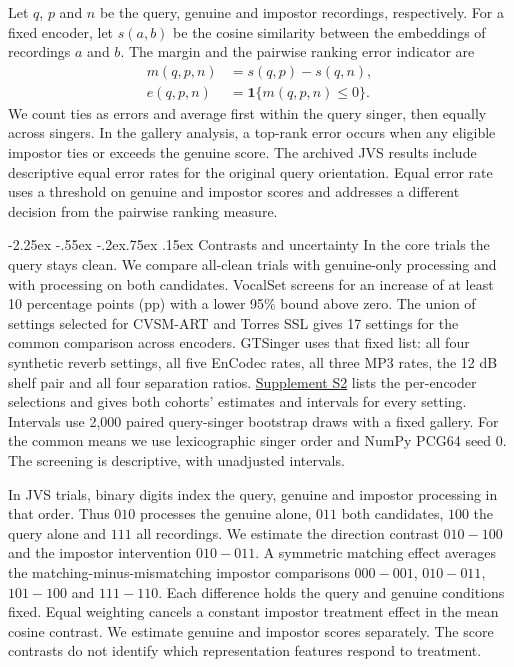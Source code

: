 \documentclass[10pt,a4paper]{article}
\makeatletter
\renewcommand\subsection{\@startsection{subsection}{2}{\z@}%
  {-2.25ex \@plus -.55ex \@minus -.2ex}{.75ex \@plus .15ex}%
  {\normalfont\normalsize\sffamily\bfseries}}
\newcommand{\evidencebase}{https://github.com/hawkeye007-dev/singer-or-studio/blob/2ea186d03cb15b8dee027aee72ddae81a2c91856}
\newcommand{\evidencelink}[2]{\href{\evidencebase/#1}{#2}}
\makeatother
\begin{document}
Let $q$, $p$ and $n$ be the query, genuine and impostor recordings, respectively. For a fixed encoder, let $s(a,b)$ be the cosine similarity between the embeddings of recordings $a$ and $b$. The margin and the pairwise ranking error indicator are
\begin{equation}
 \begin{aligned}
 m(q,p,n)&=s(q,p)-s(q,n),\\
 e(q,p,n)&=\mathbf{1}\{m(q,p,n)\leq 0\}.
 \end{aligned}
 \label{eq:margin}
\end{equation}
We count ties as errors and average first within the query singer, then equally across singers. In the gallery analysis, a top-rank error occurs when any eligible impostor ties or exceeds the genuine score. The archived JVS results include descriptive equal error rates for the original query orientation. Equal error rate uses a threshold on genuine and impostor scores and addresses a different decision from the pairwise ranking measure.

\subsection{Contrasts and uncertainty}
In the core trials the query stays clean. We compare all-clean trials with genuine-only processing and with processing on both candidates. VocalSet screens for an increase of at least 10 percentage points (pp) with a lower 95\% bound above zero. The union of settings selected for CVSM-ART and Torres SSL gives 17 settings for the common comparison across encoders. GTSinger uses that fixed list: all four synthetic reverb settings, all five EnCodec rates, all three MP3 rates, the 12 dB shelf pair and all four separation ratios. \evidencelink{evidence/supplement.md\#s2-core-benchmark-condition-tables}{Supplement S2} lists the per-encoder selections and gives both cohorts' estimates and intervals for every setting. Intervals use 2,000 paired query-singer bootstrap draws with a fixed gallery. For the common means we use lexicographic singer order and NumPy PCG64 seed 0. The screening is descriptive, with unadjusted intervals.

In JVS trials, binary digits index the query, genuine and impostor processing in that order. Thus $010$ processes the genuine alone, $011$ both candidates, $100$ the query alone and $111$ all recordings. We estimate the direction contrast $010-100$ and the impostor intervention $010-011$. A symmetric matching effect averages the matching-minus-mismatching impostor comparisons $000-001$, $010-011$, $101-100$ and $111-110$. Each difference holds the query and genuine conditions fixed. Equal weighting cancels a constant impostor treatment effect in the mean cosine contrast. We estimate genuine and impostor scores separately. The score contrasts do not identify which representation features respond to treatment.
\end{document}
